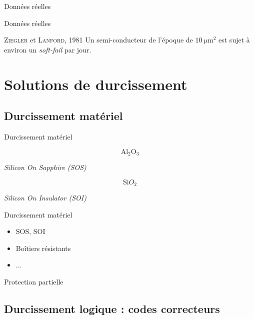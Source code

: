 \documentclass[french,bookmarks,aspectratio=43]{beamer}
\begin{document}
\begin{frame}{Données réelles}
\begin{minipage}{0.4\linewidth}
    \end{minipage}
\end{frame}

\begin{frame}{Données réelles}
    \begin{bform}{\textsc{Ziegler} et \textsc{Lanford}, 1981}{}
        Un semi-conducteur de l'époque de $\qty{10}{\micro\meter\squared}$ est sujet à environ un \emph{soft-fail} par jour.
    \end{bform}
\end{frame}

\section{Solutions de durcissement}

\subsection{Durcissement matériel}

\begin{frame}{Durcissement matériel}
    \begin{minipage}{0.4\linewidth}
        \[ \mathrm{Al}_2\mathrm O_3\]

        \emph{Silicon On Sapphire (SOS)}
    \end{minipage}
    \hfill\pause
    \begin{minipage}{0.4\linewidth}
        \[ \mathrm{Si} O_2\]

        \emph{Silicon On Insulator (SOI)}
    \end{minipage}
\end{frame}

\begin{frame}{Durcissement matériel}
    \begin{itemize}
        \item SOS, SOI\pause
        
        \item Boîtiers résistants

        \item $\dots$\pause
    \end{itemize}

    Protection partielle
\end{frame}

\subsection{Durcissement logique : codes correcteurs}
\end{document}
